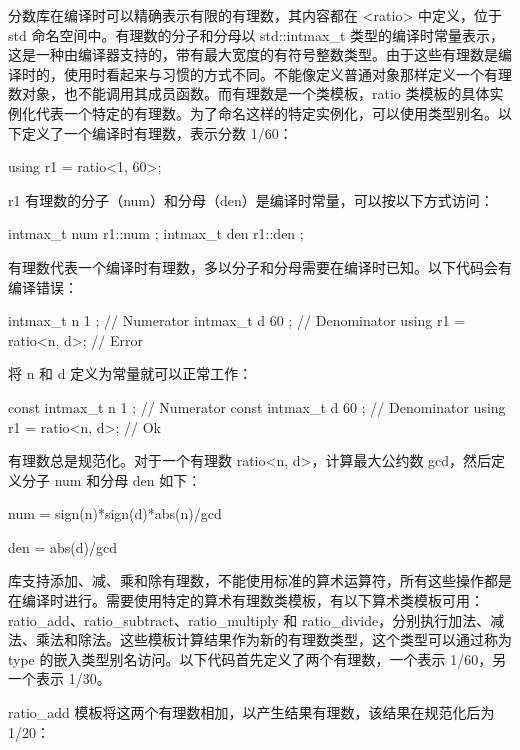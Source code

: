 分数库在编译时可以精确表示有限的有理数，其内容都在 <ratio> 中定义，位于 std 命名空间中。有理数的分子和分母以 std::intmax\_t 类型的编译时常量表示，这是一种由编译器支持的，带有最大宽度的有符号整数类型。由于这些有理数是编译时的，使用时看起来与习惯的方式不同。不能像定义普通对象那样定义一个有理数对象，也不能调用其成员函数。而有理数是一个类模板，ratio 类模板的具体实例化代表一个特定的有理数。为了命名这样的特定实例化，可以使用类型别名。以下定义了一个编译时有理数，表示分数 1/60：

\begin{cpp}
using r1 = ratio<1, 60>;
\end{cpp}

r1 有理数的分子（num）和分母（den）是编译时常量，可以按以下方式访问：

\begin{cpp}
intmax_t num { r1::num };
intmax_t den { r1::den };
\end{cpp}

有理数代表一个编译时有理数，多以分子和分母需要在编译时已知。以下代码会有编译错误：

\begin{cpp}
intmax_t n { 1 }; // Numerator
intmax_t d { 60 }; // Denominator
using r1 = ratio<n, d>; // Error
\end{cpp}

将 n 和 d 定义为常量就可以正常工作：

\begin{cpp}
const intmax_t n { 1 }; // Numerator
const intmax_t d { 60 }; // Denominator
using r1 = ratio<n, d>; // Ok
\end{cpp}

有理数总是规范化。对于一个有理数 ratio<n, d>，计算最大公约数 gcd，然后定义分子 num 和分母 den 如下：

\begin{cpp}
num = sign(n)*sign(d)*abs(n)/gcd
\end{cpp}

\begin{cpp}
den = abs(d)/gcd
\end{cpp}

库支持添加、减、乘和除有理数，不能使用标准的算术运算符，所有这些操作都是在编译时进行。需要使用特定的算术有理数类模板，有以下算术类模板可用：ratio\_add、ratio\_subtract、ratio\_multiply 和 ratio\_divide，分别执行加法、减法、乘法和除法。这些模板计算结果作为新的有理数类型，这个类型可以通过称为 type 的嵌入类型别名访问。以下代码首先定义了两个有理数，一个表示 1/60，另一个表示 1/30。

ratio\_add 模板将这两个有理数相加，以产生结果有理数，该结果在规范化后为 1/20：

